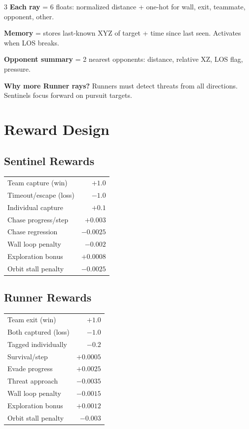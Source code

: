 \documentclass[10pt,landscape,a4paper]{article}
\begin{document}
\begin{multicols}{3}
\vspace{2pt}
\textbf{Each ray} = 6 floats: normalized distance + one-hot for wall, exit, teammate, opponent, other.

\textbf{Memory} = stores last-known XYZ of target + time since last seen. Activates when LOS breaks.

\textbf{Opponent summary} = 2 nearest opponents: distance, relative XZ, LOS flag, pressure.

\textbf{Why more Runner rays?} Runners must detect threats from all directions. Sentinels focus forward on pursuit targets.

\section{Reward Design}

\subsection{Sentinel Rewards}
\begin{tabular}{@{}lr@{}}
Team capture (win) & $+1.0$ \\
Timeout/escape (loss) & $-1.0$ \\
Individual capture & $+0.1$ \\
Chase progress/step & $+0.003$ \\
Chase regression & $-0.0025$ \\
Wall loop penalty & $-0.002$ \\
Exploration bonus & $+0.0008$ \\
Orbit stall penalty & $-0.0025$ \\
\end{tabular}

\subsection{Runner Rewards}
\begin{tabular}{@{}lr@{}}
Team exit (win) & $+1.0$ \\
Both captured (loss) & $-1.0$ \\
Tagged individually & $-0.2$ \\
Survival/step & $+0.0005$ \\
Evade progress & $+0.0025$ \\
Threat approach & $-0.0035$ \\
Wall loop penalty & $-0.0015$ \\
Exploration bonus & $+0.0012$ \\
Orbit stall penalty & $-0.003$ \\
\end{tabular}


\end{multicols}
\end{document}
